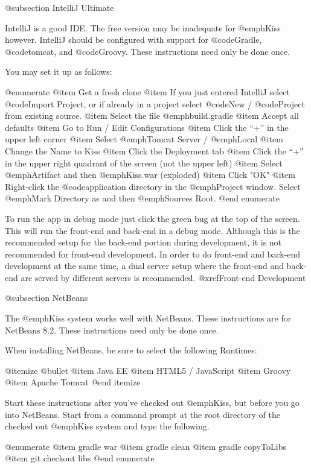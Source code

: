 @subsection IntelliJ Ultimate

IntelliJ is a good IDE.  The free version may be inadequate for
@emph{Kiss} however.  IntelliJ should be configured with support for
@code{Gradle}, @code{tomcat}, and @code{Groovy}.  These instructions
need only be done once.

You may set it up as follows:

@enumerate
@item
Get a fresh clone
@item
If you just entered IntelliJ select @code{Import Project}, 
or if already in a project select @code{New} / @code{Project}
from existing source.
@item
Select the file @emph{build.gradle}
@item
Accept all defaults
@item
Go to Run / Edit Configurations
@item
Click the ``+'' in the upper left corner
@item
Select @emph{Tomcat Server} / @emph{Local}
@item
Change the Name to Kiss
@item
Click the Deployment tab
@item
Click the ``+'' in the upper right quadrant of the screen (not the upper left)
@item
Select @emph{Artifact} and then @emph{Kiss.war} (exploded)
@item
Click "OK"
@item
Right-click the @code{application} directory in the @emph{Project} window.
Select @emph{Mark Directory as} and then @emph{Sources Root}.
@end enumerate

To run the app in debug mode just click the green bug at the top of the screen.  This will run the front-end and back-end 
in a debug mode.  Although this is the recommended setup for the back-end portion during development, it is not recommended
for front-end development.  In order to do front-end and back-end development at the same time, a dual server setup where
the front-end and back-end are served by different servers is recommended.    @xref{Front-end Development}

@subsection NetBeans

The @emph{Kiss} system works well with NetBeans.  These instructions
are for NetBeans 8.2.  These instructions need only be done once.

When installing NetBeans, be sure to select the following Runtimes:

@itemize @bullet
@item
Java EE
@item
HTML5 / JavaScript
@item
Groovy
@item
Apache Tomcat
@end itemize

Start these instructions after you've checked out @emph{Kiss}, but before you go into NetBeans.   
Start from a command prompt at the root directory of the checked out @emph{Kiss} system and type the following.

@enumerate
@item
gradle war
@item
gradle clean
@item
gradle copyToLibs
@item
git checkout libs
@end enumerate

